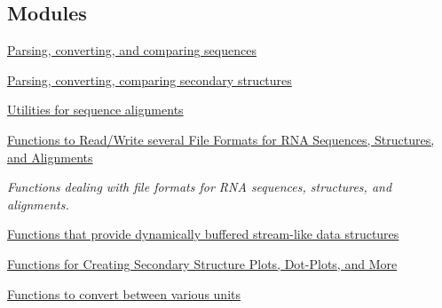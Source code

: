 \subsection*{Modules}
\begin{DoxyCompactItemize}
\item 
\hyperlink{group__string__utils}{Parsing, converting, and comparing sequences}
\item 
\hyperlink{group__struct__utils}{Parsing, converting, comparing secondary structures}
\item 
\hyperlink{group__aln__utils}{Utilities for sequence alignments}
\item 
\hyperlink{group__file__utils}{Functions to Read/\+Write several File Formats for R\+N\+A Sequences, Structures, and Alignments}
\begin{DoxyCompactList}\small\item\em Functions dealing with file formats for R\+NA sequences, structures, and alignments. \end{DoxyCompactList}\item 
\hyperlink{group__buffer__utils}{Functions that provide dynamically buffered stream-\/like data structures}
\item 
\hyperlink{group__plotting__utils}{Functions for Creating Secondary Structure Plots, Dot-\/\+Plots, and More}
\item 
\hyperlink{group__units}{Functions to convert between various units}
\end{DoxyCompactItemize}
